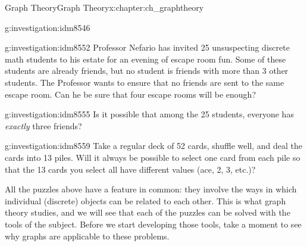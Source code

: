 \documentclass[oneside,10pt,]{book}
\numberwithin{equation}{chapter}
\begin{document}
\begin{chapterptx}{Graph Theory}{}{Graph Theory}{}{}{x:chapter:ch_graphtheory}
\begin{introduction}{}
\begin{investigation}{}{g:investigation:idm8546}
\begin{sidebyside}{1}{0}{0}{0}
\begin{sbspanel}{1}
{
}%
\end{sbspanel}%
\end{sidebyside}%
\end{investigation}
\begin{investigation}{}{g:investigation:idm8552}%
Professor Nefario has invited 25 unsuspecting discrete math students to his estate for an evening of escape room fun.  Some of these students are already friends, but no student is friends with more than 3 other students.  The Professor wants to ensure that no friends are sent to the same escape room.  Can he be sure that four escape rooms will be enough?%
\end{investigation}
\begin{investigation}{}{g:investigation:idm8555}%
Is it possible that among the 25 students, everyone has \emph{exactly} three friends?%
\end{investigation}
\begin{investigation}{}{g:investigation:idm8559}%
Take a regular deck of 52 cards, shuffle well, and deal the cards into 13 piles.  Will it always be possible to select one card from each pile so that the 13 cards you select all have different values (ace, 2, 3, etc.)?%
\end{investigation}
All the puzzles above have a feature in common: they involve the ways in which individual (discrete) objects can be related to each other.  This is what graph theory studies, and we will see that each of the puzzles can be solved with the tools of the subject.  Before we start developing those tools, take a moment to see why graphs are applicable to these problems.%

\end{introduction}
\end{chapterptx}
\end{document}
